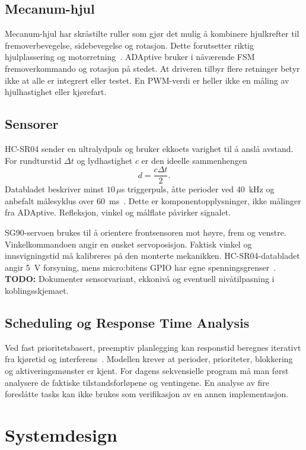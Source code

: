 \documentclass[a4paper,11pt,oneside]{report}
\newcommand{\todo}[1]{\textcolor{todocolor}{\textbf{TODO:} #1}}
\begin{document}
\section{Mecanum-hjul}
Mecanum-hjul har skråstilte ruller som gjør det mulig å kombinere
hjulkrefter til fremoverbevegelse, sidebevegelse og rotasjon.
Dette forutsetter riktig hjulplassering og motorretning~\cite{mecanum}.
ADAptive bruker i nåværende FSM fremoverkommando og rotasjon på stedet.
At driveren tilbyr flere retninger betyr ikke at alle er integrert eller testet.
En PWM-verdi er heller ikke en måling av hjulhastighet eller kjørefart.

\section{Sensorer}
HC-SR04 sender en ultralydpuls og bruker ekkoets varighet til å anslå avstand.
For rundturstid $\Delta t$ og lydhastighet $c$ er den ideelle sammenhengen
\begin{equation}
d=\frac{c\Delta t}{2}.\label{eq:ultra}
\end{equation}
Databladet beskriver minst $10\,\mu$s triggerpuls, åtte perioder ved 40~kHz og
anbefalt målesyklus over 60~ms~\cite{hcsr04}. Dette er komponentopplysninger,
ikke målinger fra ADAptive. Refleksjon, vinkel og målflate påvirker signalet.

SG90-servoen brukes til å orientere frontsensoren mot høyre, frem og venstre.
Vinkelkommandoen angir en ønsket servoposisjon. Faktisk vinkel og innsvigningstid
må kalibreres på den monterte mekanikken. HC-SR04-databladet angir 5~V
forsyning, mens micro:bitens GPIO har egne spenningsgrenser~\cite{hcsr04,pins}.
\todo{Dokumenter sensorvariant, ekkonivå og eventuell nivåtilpasning i koblingsskjemaet.}

\section{Scheduling og Response Time Analysis}
Ved fast prioritetsbasert, preemptiv planlegging kan responstid beregnes
iterativt fra kjøretid og interferens~\cite{josephpandya}. Modellen krever at perioder,
prioriteter, blokkering og aktiveringsmønster er kjent. For dagens
sekvensielle program må man først analysere de faktiske tilstandsforløpene
og ventingene. En analyse av fire foreslåtte tasks kan ikke brukes som
verifikasjon av en annen implementasjon.

\chapter{Systemdesign}\label{ch:design}
\end{document}

